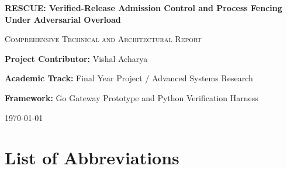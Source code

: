 \documentclass[12pt,a4paper]{report}
\begin{document}
\begin{titlepage}
    \centering
    \vspace*{1.5cm}
    
    {\Huge \bfseries RESCUE: Verified-Release Admission Control and Process Fencing Under Adversarial Overload \par}
    \vspace{0.8cm}
    {\Large \scshape Comprehensive Technical and Architectural Report \par}
    
    \vspace{2cm}
    {\large \textbf{Project Contributor:} Vishal Acharya \par}
    {\large \textbf{Academic Track:} Final Year Project / Advanced Systems Research \par}
    {\large \textbf{Framework:} Go Gateway Prototype and Python Verification Harness \par}
    
    \vfill
    {\large \today \par}
\end{titlepage}


\chapter*{List of Abbreviations}
\end{document}
